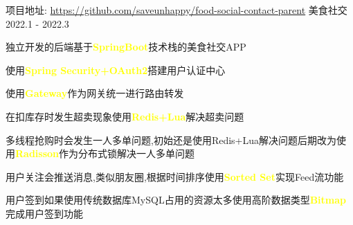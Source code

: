 \begin{cventries}
	\cventry
	{项目地址: \url{https://github.com/saveunhappy/food-social-contact-parent}} %
	{美食社交} %
	{} %
	{2022.1 - 2022.3} %
	{
		\begin{cvitems} %
			\item {独立开发的后端基于\textcolor{yellow}{\textbf{SpringBoot}}技术栈的美食社交APP}
			\item {使用\textcolor{yellow}{\textbf{Spring Security+OAuth2}}搭建用户认证中心}
			\item {使用\textcolor{yellow}{\textbf{Gateway}}作为网关统一进行路由转发}
			\item {在扣库存时发生超卖现象使用\textcolor{yellow}{\textbf{Redis+Lua}}解决超卖问题}
			\item {多线程抢购时会发生一人多单问题,初始还是使用Redis+Lua解决问题后期改为使用\textcolor{yellow}{\textbf{Radisson}}作为分布式锁解决一人多单问题}
			\item {用户关注会推送消息,类似朋友圈,根据时间排序使用\textcolor{yellow}{\textbf{Sorted Set}}实现Feed流功能}
			\item {用户签到如果使用传统数据库MySQL占用的资源太多使用高阶数据类型\textcolor{yellow}{\textbf{Bitmap}}完成用户签到功能}
		\end{cvitems}
	}



\end{cventries}
